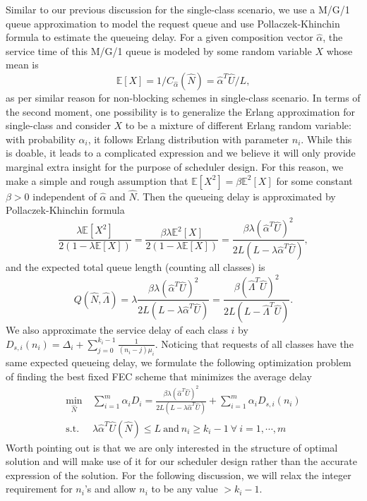 \documentclass[journal]{IEEEtran}
\newcommand{\rateVec}{\hat{\Lambda}}
\newcommand{\codeVec}{\hat{N}}
\newcommand{\usageVec}{\hat{U}}
\newcommand{\compVec}{\hat{\alpha}}
\newcommand{\Expect}{\mathbb{E}}
\begin{document}
Similar to our previous discussion for the single-class scenario, we use a M/G/1 queue approximation to model the request queue and use Pollaczek-Khinchin formula to estimate the queueing delay. For a given composition vector $\compVec$, the service time of this M/G/1 queue is modeled by some random variable $X$ whose mean is
\begin{equation*}
\Expect[X] = 1/C_{\compVec}(\codeVec) = \compVec^T \usageVec/L,
\end{equation*}
as per similar reason for non-blocking schemes in single-class scenario. In terms of the second moment, one possibility is to  generalize the Erlang approximation for single-class and consider $X$ to be a mixture of different Erlang random variable: with probability $\alpha_i$, it follows Erlang distribution with parameter $n_i$. While this is doable, it leads to a complicated expression and we believe it will only provide marginal extra insight for the purpose of scheduler design. For this reason, we make a simple and rough assumption that $\Expect[X^2] = \beta \Expect^2[X]$ for some constant $\beta>0$ independent of $\compVec$ and $\codeVec$.
Then the queueing delay is approximated by Pollaczek-Khinchin formula 
\begin{equation*}
\frac{\lambda \Expect[X^2]}{2(1-\lambda \Expect[X])}
= \frac{\beta \lambda \Expect^2[X]}{2(1-\lambda \Expect[X])}
= \frac{\beta \lambda (\compVec^T \usageVec)^2}{2L(L-\lambda \compVec^T\usageVec)},
\end{equation*}
and the expected total queue length (counting all classes) is
\begin{equation*}
Q(\codeVec,\rateVec)=\lambda \frac{\beta \lambda (\compVec^T \usageVec)^2}{2L(L-\lambda \compVec^T\usageVec)} = \frac{\beta ( \rateVec^T \usageVec)^2}{2L(L- \rateVec^T\usageVec)}.
\end{equation*}
We also approximate the service delay of each class $i$  by $D_{s,i}(n_i) = \Delta_i + \sum_{j=0}^{k_i-1}\frac{1}{(n_i-j)\mu_i}$. Noticing that requests of all classes have the same expected queueing delay, we formulate the following optimization problem of finding the best fixed FEC scheme that minimizes the average delay 
\begin{align}
\min_{\codeVec} ~& \sum_{i=1}^m  \alpha_i D_i 
= \frac{\beta \lambda (\compVec^T \usageVec)^2}{2L(L-\lambda \compVec^T\usageVec)}
 + \sum_{i=1}^m \alpha_i D_{s,i}(n_i)  
\label{eq:multi:optimization}\\
\textrm{s.t.} ~& \lambda \compVec^T\usageVec(\codeVec) \le L 
~\textrm{and}
~ n_i \ge k_i-1~\forall~ i=1,\cdots,m \nonumber
\end{align}
Worth pointing out is that we are only interested in the structure of optimal solution and will make use of it for our scheduler design rather than the accurate expression of the solution.
For the following discussion, we will relax the integer requirement for $n_i$'s and allow $n_i$ to be any value $>k_i-1$. 
\end{document}
